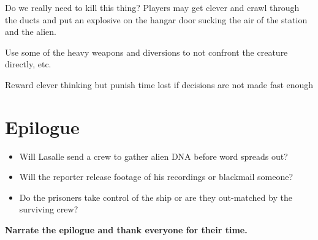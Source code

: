  
\begin{rpg-commentbox}{Do we really need to kill this thing?}
    Players may get clever and crawl through the ducts and put an explosive on the hangar door sucking the air of the station and the alien. 
    
    Use some of the heavy weapons and diversions to not confront the creature directly, etc.

    Reward clever thinking but punish time lost if decisions are not made fast enough
 \end{rpg-commentbox}

\newsect 

\section{Epilogue} 
 
\begin{rpg-commentbox}{}


\begin{itemize}
    \item Will Lasalle send a crew to gather alien DNA before word spreads out?
    \item Will the reporter release footage of his recordings or blackmail someone?
    \item Do the prisoners take control of the ship or are they out-matched by the surviving crew?
\end{itemize}    

    \medskip

    \textbf{Narrate the epilogue and thank everyone for their time.}
    \end{rpg-commentbox}

    \newsect

    